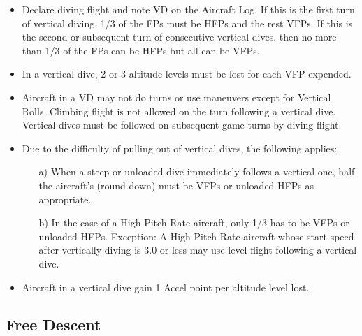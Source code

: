 \begin{itemize}


    \item{} Declare diving flight and note VD on the Aircraft Log. If this is the first turn of vertical diving, 1/3 of the FPs must be HFPs and the rest VFPs. If this is the second or subsequent turn of consecutive vertical dives, then no more than 1/3 of the FPs can be HFPs but all can be VFPs.

    \item{} In a vertical dive, 2 or 3 altitude levels must be lost for each VFP expended.

    \item{} Aircraft in a VD may not do turns or use maneuvers except for Vertical Rolls. Climbing flight is not allowed on the turn following a vertical dive. Vertical dives must be followed on subsequent game turns by diving flight.

    \item{} Due to the difficulty of pulling out of vertical dives, the following applies:
    \begin{enumerate}
        \item[a)] When a steep or unloaded dive immediately follows a vertical one, half the aircraft's  (round down) must be VFPs or unloaded HFPs as appropriate.
        \item[b)]  In the case of a High Pitch Rate aircraft, only 1/3 has to be VFPs or unloaded HFPs. Exception: A High Pitch Rate aircraft whose start speed after vertically diving is 3.0 or less may use level flight following a vertical dive.
    \end{enumerate}

    \item{} Aircraft in a vertical dive gain 1 Accel point per altitude level lost.

\end{itemize}

\subsection{Free Descent}

